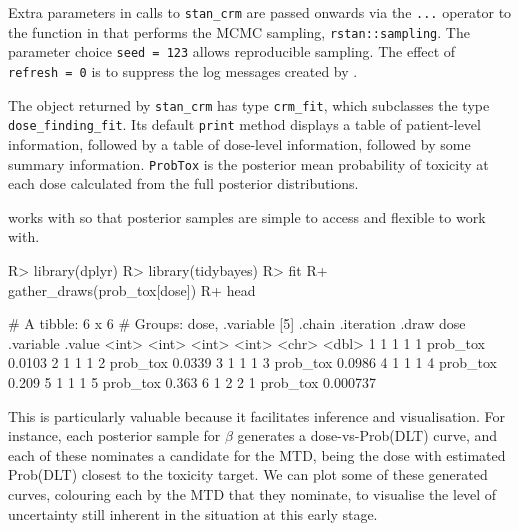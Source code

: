 \documentclass[article]{jss}
\begin{document}
Extra parameters in calls to \texttt{stan\_crm} are passed onwards via
the \texttt{...} operator to the function in  that performs
the MCMC sampling, \texttt{rstan::sampling}. The parameter choice
\texttt{seed\ =\ 123} allows reproducible sampling. The effect of
\texttt{refresh\ =\ 0} is to suppress the log messages created by
.

The object returned by \texttt{stan\_crm} has type \texttt{crm\_fit},
which subclasses the type \texttt{dose\_finding\_fit}. Its default
\texttt{print} method displays a table of patient-level information,
followed by a table of dose-level information, followed by some summary
information. \texttt{ProbTox} is the posterior mean probability of
toxicity at each dose calculated from the full posterior distributions.

 works with  \citep{tidybayes} so that
posterior samples are simple to access and flexible to work with.

\begin{CodeChunk}

\begin{CodeInput}
R> library(dplyr)
R> library(tidybayes)
R> fit %
R+   gather_draws(prob_tox[dose]) %
R+   head
\end{CodeInput}

\begin{CodeOutput}
# A tibble: 6 x 6
# Groups:   dose, .variable [5]
  .chain .iteration .draw  dose .variable   .value
   <int>      <int> <int> <int> <chr>        <dbl>
1      1          1     1     1 prob_tox  0.0103  
2      1          1     1     2 prob_tox  0.0339  
3      1          1     1     3 prob_tox  0.0986  
4      1          1     1     4 prob_tox  0.209   
5      1          1     1     5 prob_tox  0.363   
6      1          2     2     1 prob_tox  0.000737
\end{CodeOutput}
\end{CodeChunk}

This is particularly valuable because it facilitates inference and
visualisation. For instance, each posterior sample for \(\beta\)
generates a dose-vs-Prob(DLT) curve, and each of these nominates a
candidate for the MTD, being the dose with estimated Prob(DLT) closest
to the toxicity target. We can plot some of these generated curves,
colouring each by the MTD that they nominate, to visualise the level of
uncertainty still inherent in the situation at this early stage.
\end{document}
